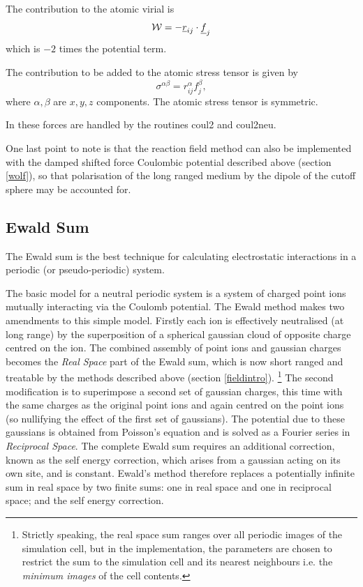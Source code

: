 The contribution to the atomic virial is
\begin{equation}
{\cal W}=-\mbox{$\underline{r}$}_{ij}\cdot\mbox{$\underline{f}$}_{j}
\end{equation}
which is $-2$ times the potential term.

The contribution to be added to the atomic stress tensor is
given by
\begin{equation}
\sigma^{\alpha \beta}=r_{ij}^{\alpha}f_{j}^{\beta},
\end{equation}
where $\alpha,\beta$ are $x,y,z$ components. The atomic stress tensor
is symmetric. 

In \D{} these forces are handled by the routines {\sc coul2}
and {\sc coul2neu}.

One last point to note is that the reaction field method can also be
implemented with the damped shifted force Coulombic potential
described above (section \ref{wolf}), so that polarisation of the long
ranged medium by the dipole of the cutoff sphere may be accounted for.

\subsection{Ewald Sum}
\label{ewaldsum}

The Ewald sum \cite{allen-89a} is the best technique for
calculating electrostatic interactions in a periodic (or
pseudo-periodic) system.

The basic model for a neutral periodic system is a system of charged
point ions mutually interacting via the Coulomb potential. The Ewald
method makes two amendments to this simple model.  Firstly each ion is
effectively neutralised (at long range) by the superposition of a
spherical gaussian cloud of opposite charge centred on the ion.  The
combined assembly of point ions and gaussian charges becomes the {\em
Real Space} part of the Ewald sum, which is now short ranged and
treatable by the methods described above (section \ref{fieldintro}).
\footnote{Strictly speaking,
the real space sum ranges over all periodic images of the simulation
cell, but in the \D{} implementation, the parameters are chosen to
restrict the sum to the simulation cell and its nearest neighbours
i.e. the {\em minimum images} of the cell contents.} The second
modification is to superimpose a second set of gaussian charges, this
time with the same charges as the original point ions and again
centred on the point ions (so nullifying the effect of the first set
of gaussians). The potential due to these gaussians is obtained from
Poisson's equation and is solved as a Fourier series in {\em
Reciprocal Space}.  The complete Ewald sum requires an additional
correction, known as the self energy correction, which arises from a
gaussian acting on its own site, and is constant.  Ewald's method
therefore replaces a potentially infinite sum in real space by two
finite sums: one in real space and one in reciprocal space; and the
self energy correction.

